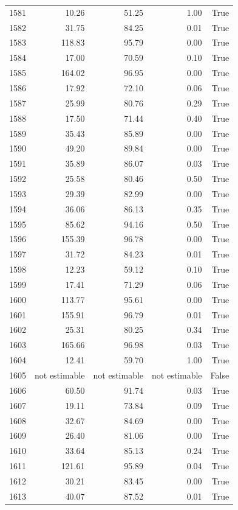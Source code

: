 \begin{longtable}{rrrrr}
1581 & 10.26 & 51.25 & 1.00 & True \\
1582 & 31.75 & 84.25 & 0.01 & True \\
1583 & 118.83 & 95.79 & 0.00 & True \\
1584 & 17.00 & 70.59 & 0.10 & True \\
1585 & 164.02 & 96.95 & 0.00 & True \\
1586 & 17.92 & 72.10 & 0.06 & True \\
1587 & 25.99 & 80.76 & 0.29 & True \\
1588 & 17.50 & 71.44 & 0.40 & True \\
1589 & 35.43 & 85.89 & 0.00 & True \\
1590 & 49.20 & 89.84 & 0.00 & True \\
1591 & 35.89 & 86.07 & 0.03 & True \\
1592 & 25.58 & 80.46 & 0.50 & True \\
1593 & 29.39 & 82.99 & 0.00 & True \\
1594 & 36.06 & 86.13 & 0.35 & True \\
1595 & 85.62 & 94.16 & 0.50 & True \\
1596 & 155.39 & 96.78 & 0.00 & True \\
1597 & 31.72 & 84.23 & 0.01 & True \\
1598 & 12.23 & 59.12 & 0.10 & True \\
1599 & 17.41 & 71.29 & 0.06 & True \\
1600 & 113.77 & 95.61 & 0.00 & True \\
1601 & 155.91 & 96.79 & 0.01 & True \\
1602 & 25.31 & 80.25 & 0.34 & True \\
1603 & 165.66 & 96.98 & 0.03 & True \\
1604 & 12.41 & 59.70 & 1.00 & True \\
1605 & not estimable & not estimable & not estimable & False \\
1606 & 60.50 & 91.74 & 0.03 & True \\
1607 & 19.11 & 73.84 & 0.09 & True \\
1608 & 32.67 & 84.69 & 0.00 & True \\
1609 & 26.40 & 81.06 & 0.00 & True \\
1610 & 33.64 & 85.13 & 0.24 & True \\
1611 & 121.61 & 95.89 & 0.04 & True \\
1612 & 30.21 & 83.45 & 0.00 & True \\
1613 & 40.07 & 87.52 & 0.01 & True \\

\end{longtable}
